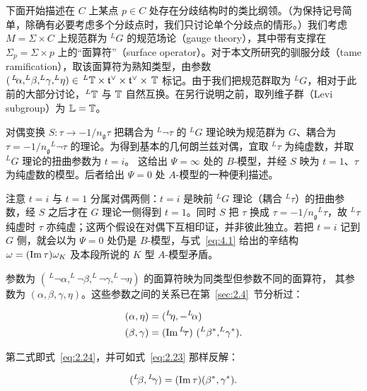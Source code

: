 下面开始描述在 $C$ 上某点 $p\in C$ 处存在分歧结构时的类比纲领。（为保持记号简单，除确有必要考虑多个分歧点时，我们只讨论单个分歧点的情形。）我们考虑 $M=\Sigma\times C$ 上规范群为 $^LG$ 的规范场论（gauge theory），其中带有支撑在 $\Sigma_p=\Sigma\times p$ 上的“面算符”（surface operator）。对于本文所研究的驯服分歧（tame ramification），取该面算符为熟知类型，由参数
$(\,^L\neg\alpha,^L\neg\beta,^L\neg\gamma,^L\neg\eta)\in\,
^L\TT\times \mathfrak t^\vee\times \mathfrak t^\vee\times \,\TT$ 标记。由于我们把规范群取为 $^LG$，相对于此前的大部分讨论，$^L\TT$ 与
$\TT$ 自然互换。在另行说明之前，取列维子群（Levi subgroup）为 $\mathbb{L}=\TT$。

对偶变换 $S:\tau\to -1/n_{\mathfrak g}\tau$ 把耦合为 $^L\neg \tau$ 的
$^LG$ 理论映为规范群为 $G$、耦合为
$\tau=-1/n_\mathfrak g{}^L\neg\tau$ 的理论。为得到基本的几何朗兰兹对偶，宜取 $^L\tau$ 为纯虚数，并取 $^LG$ 理论的扭曲参数为 $t=i$。
这给出 $\Psi=\infty$ 处的 $B$-模型，并经 $S$ 映为 $t=1$、$\tau$ 为纯虚数的模型。后者给出 $\Psi=0$ 处 $A$-模型的一种便利描述。

\begin{yizhu}[易错点]
注意 $t=i$ 与 $t=1$ 分属对偶两侧：$t=i$ 是映前 $^LG$ 理论（耦合 $^L\tau$）的扭曲参数，经 $S$ 之后才在 $G$ 理论一侧得到 $t=1$。同时 $S$ 把 $\tau$ 换成 $\tau=-1/n_{\mathfrak g}{}^L\tau$，故 $^L\tau$ 纯虚时 $\tau$ 亦纯虚；这两个假设在对偶下互相印证，并非彼此独立。若把 $t=i$ 记到 $G$ 侧，就会以为 $\Psi=0$ 处仍是 $B$-模型，与式~\eqref{eq:4.1} 给出的辛结构 $\omega=({\rm Im}\,\tau)\omega_K$ 及本段所说的 $K$ 型 $A$-模型矛盾。
\end{yizhu}

参数为 $(\,^L\neg\alpha,^L\neg\beta,
^L\neg\gamma,^L\neg\eta)$ 的面算符映为同类型但参数不同的面算符，
其参数为 $(\alpha,\beta,\gamma,\eta)$。这些参数之间的关系已在第~\ref{sec:2.4}~节分析过：

\setcounter{equation}{1}
\begin{equation}\label{eq:4.2}
  \begin{aligned}(\alpha,\eta)&=(^L\neg\eta,-^L\neg\alpha)\\
                     (\beta,\gamma)&=({\rm Im}\,^L\neg\tau)\,\,(^L\beta^*,^L\neg\gamma^*).\end{aligned}
\end{equation}

第二式即式~\eqref{eq:2.24}，并可如式~\eqref{eq:2.23} 那样反解：

\setcounter{equation}{2}
\begin{equation}\label{eq:4.3}
  ({}^L\neg\beta,{}^L\neg\gamma)=({\rm Im}\,\tau)(\beta^*,\gamma^*).
\end{equation}

